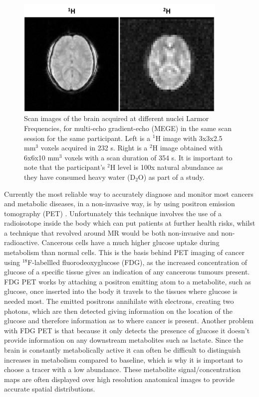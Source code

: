 \documentclass[class=article, crop=false]{standalone}
\begin{document}
\begin{figure}[ht]
    \centering
    \includegraphics[width=0.9\textwidth]{Figures/Intro/1H2H_Brain.png}
    \caption{Scan images of the brain acquired at different nuclei Larmor Frequencies, for multi-echo gradient-echo (MEGE) in the same scan session for the same participant. Left is a $^1$H image with 3x3x2.5 mm$^3$ voxels acquired in 232 s. Right is a $^2$H image obtained with 6x6x10 mm$^3$ voxels with a scan duration of 354 s. It is important to note that the participant's $^2$H level is 100x natural abundance as they have consumed heavy water (D$_2$O) as part of a study.}
    \label{fig:intro:1H2H_Brain}
\end{figure}

Currently the most reliable way to accurately diagnose and monitor most cancers and metabolic diseases, in a non-invasive way, is by using positron emission tomography (PET) \cite{Almuhaideb201118F-FDGOncology}. Unfortunately this technique involves the use of a radioisotope inside the body which can put patients at further health risks, whilst a technique that revolved around MR would be both non-invasive and non-radioactive. Cancerous cells have a much higher glucose uptake during metabolism than normal cells. This is the basis behind PET imaging of cancer using $^{18}$F-labellled fluorodeoxyglucose (FDG), as the increased concentration of glucose of a specific tissue gives an indication of any cancerous tumours present. FDG PET works by attaching a positron emitting atom to a metabolite, such as glucose, once inserted into the body it travels to the tissues where glucose is needed most. The emitted positrons annihilate with electrons, creating two photons, which are then detected giving information on the location of the glucose and therefore information as to where cancer is present. Another problem with FDG PET is that because it only detects the presence of glucose it doesn't provide information on any downstream metabolites such as lactate. Since the brain is constantly metabolically active it can often be difficult to distinguish increases in metabolism compared to baseline, which is why it is important to choose a tracer with a low abundance. These metabolite signal/concentration maps are often displayed over high resolution anatomical images to provide accurate spatial distributions.
\end{document}
